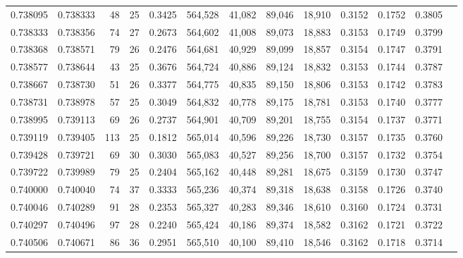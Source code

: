 \begin{tabular}{rrrrrrrrrrrrr}
0.738095 & 0.738333 &     48 &    25 &                                     0.3425 & 564,528 &  41,082 &  89,046 &  18,910 & 0.3152 & 0.1752 & 0.3805 \\
0.738333 & 0.738356 &     74 &    27 &                                     0.2673 & 564,602 &  41,008 &  89,073 &  18,883 & 0.3153 & 0.1749 & 0.3799 \\
0.738368 & 0.738571 &     79 &    26 &                                     0.2476 & 564,681 &  40,929 &  89,099 &  18,857 & 0.3154 & 0.1747 & 0.3791 \\
0.738577 & 0.738644 &     43 &    25 &                                     0.3676 & 564,724 &  40,886 &  89,124 &  18,832 & 0.3153 & 0.1744 & 0.3787 \\
0.738667 & 0.738730 &     51 &    26 &                                     0.3377 & 564,775 &  40,835 &  89,150 &  18,806 & 0.3153 & 0.1742 & 0.3783 \\
0.738731 & 0.738978 &     57 &    25 &                                     0.3049 & 564,832 &  40,778 &  89,175 &  18,781 & 0.3153 & 0.1740 & 0.3777 \\
0.738995 & 0.739113 &     69 &    26 &                                     0.2737 & 564,901 &  40,709 &  89,201 &  18,755 & 0.3154 & 0.1737 & 0.3771 \\
0.739119 & 0.739405 &    113 &    25 &                                     0.1812 & 565,014 &  40,596 &  89,226 &  18,730 & 0.3157 & 0.1735 & 0.3760 \\
0.739428 & 0.739721 &     69 &    30 &                                     0.3030 & 565,083 &  40,527 &  89,256 &  18,700 & 0.3157 & 0.1732 & 0.3754 \\
0.739722 & 0.739989 &     79 &    25 &                                     0.2404 & 565,162 &  40,448 &  89,281 &  18,675 & 0.3159 & 0.1730 & 0.3747 \\
0.740000 & 0.740040 &     74 &    37 &                                     0.3333 & 565,236 &  40,374 &  89,318 &  18,638 & 0.3158 & 0.1726 & 0.3740 \\
0.740046 & 0.740289 &     91 &    28 &                                     0.2353 & 565,327 &  40,283 &  89,346 &  18,610 & 0.3160 & 0.1724 & 0.3731 \\
0.740297 & 0.740496 &     97 &    28 &                                     0.2240 & 565,424 &  40,186 &  89,374 &  18,582 & 0.3162 & 0.1721 & 0.3722 \\
0.740506 & 0.740671 &     86 &    36 &                                     0.2951 & 565,510 &  40,100 &  89,410 &  18,546 & 0.3162 & 0.1718 & 0.3714 \\

\end{tabular}

